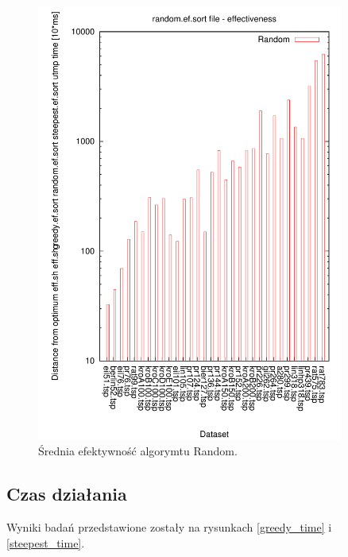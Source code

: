 \begin{figure}
\begin{center}
\includegraphics[width=0.9\textwidth]{wykresy/random_ef}
\end{center}
\caption{Średnia efektywność algorymtu Random.}
\label{random_ef}
\end{figure}

\subsection{Czas działania}

Wyniki badań przedstawione zostały na rysunkach \ref{greedy_time} i \ref{steepest_time}.

